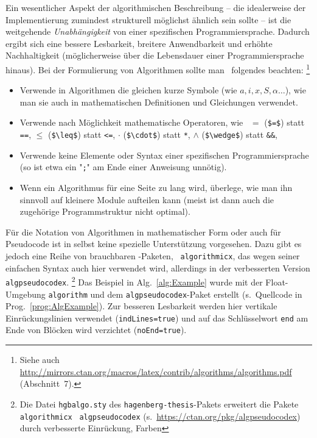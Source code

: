 Ein wesentlicher Aspekt der algorithmischen Beschreibung -- die idealerweise
der Implementierung zumindest strukturell möglichst ähnlich sein sollte --
ist die weitgehende \emph{Unabhängigkeit} von einer spezifischen
Programmiersprache. Dadurch ergibt sich eine bessere Lesbarkeit, breitere
Anwendbarkeit und erhöhte Nachhaltigkeit (möglicherweise über die Lebensdauer
einer Programmiersprache hinaus). Bei der Formulierung von Algorithmen sollte
man \ua\ folgendes beachten:%
\footnote{Siehe auch
\url{http://mirrors.ctan.org/macros/latex/contrib/algorithms/algorithms.pdf}
(Abschnitt~7).}
%
\begin{itemize}
	\item
	Verwende in Algorithmen die gleichen kurze Symbole (wie $a, i, x, S,
	\alpha \ldots$), wie man sie auch in mathematischen Definitionen und
	Gleichungen verwendet.
	\item
	Verwende nach Möglichkeit mathematische Operatoren, wie \zB\
	$=$ (\verb!$=$!) statt \texttt{==},
	$\leq$ (\verb!$\leq$!) statt \texttt{<=},
	$\cdot$ (\verb!$\cdot$!) statt \texttt{*},
	$\wedge$ (\verb!$\wedge$!) statt \texttt{\&\&},
	\usw
	\item
	Verwende keine Elemente oder Syntax einer spezifischen Programmiersprache
	(so ist etwa ein "\texttt{;}" am Ende einer Anweisung unnötig).
	\item
	Wenn ein Algorithmus für eine Seite zu lang wird, überlege, wie man ihn
	sinnvoll auf kleinere Module aufteilen kann (meist ist dann auch die
	zugehörige Programmstruktur nicht optimal).
\end{itemize}


Für die Notation von Algorithmen in mathematischer Form oder auch für
Pseudo\-code ist in \latex selbst keine spezielle Unterstützung vorgesehen.
Dazu gibt es jedoch eine Reihe von brauchbaren \latex-Paketen, \ua\
\texttt{algorithmicx}, das wegen seiner einfachen Syntax auch hier verwendet
wird, allerdings in der verbesserten Version \texttt{algpseudocodex}.%
\footnote{Die Datei \nolinkurl{hgbalgo.sty} des
\texttt{hagenberg-thesis}-Pakets erweitert die Pakete \texttt{algorithmicx}
\bzw\ \texttt{algpseudocodex} (s.\ \url{https://ctan.org/pkg/algpseudocodex})
durch verbesserte Einrückung, Farben \etc}
%
Das Beispiel in Alg.~\ref{alg:Example} wurde mit der Float-Umgebung
\texttt{algorithm} und dem \texttt{algpseudocodex}-Paket erstellt (s.\
Quellcode in Prog.\ \ref{prog:AlgExample}). Zur besseren Lesbarkeit werden
hier vertikale Einrückungslinien verwendet (\texttt{indLines=true}) und auf
das Schlüsselwort \texttt{end} am Ende von Blöcken wird verzichtet
(\texttt{noEnd=true}).

